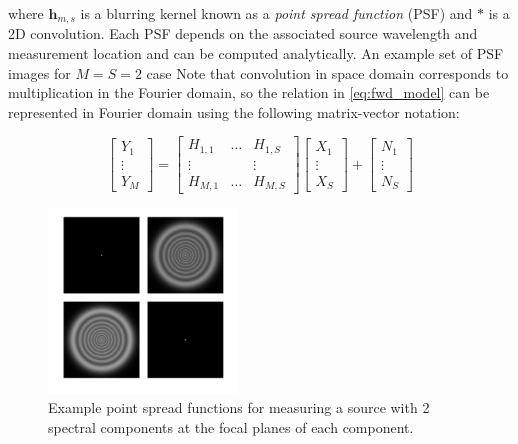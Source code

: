 \documentclass{article}
\begin{document}
where $\bm{h}_{m,s}$ is a blurring kernel known as a \emph{point spread
function} (PSF) and $\ast$ is a 2D convolution. Each PSF depends on the
associated source wavelength and measurement location and can be computed
analytically. An example set of PSF images for $M=S=2$ case
Note that convolution in space domain corresponds to
multiplication in the Fourier domain, so the relation in \eqref{eq:fwd_model}
can be represented in Fourier domain using the following matrix-vector notation:

\begin{equation}
\begin{bmatrix}Y_1 \\ \vdots \\ Y_M\end{bmatrix}
=
\begin{bmatrix}
  H_{1, 1} & \hdots & H_{1, S} \\
  \vdots & & \vdots \\
  H_{M, 1} & \hdots & H_{M, S}
\end{bmatrix}
\begin{bmatrix}X_1 \\ \vdots \\ X_S\end{bmatrix}
+
\begin{bmatrix}N_1 \\ \vdots \\ N_S\end{bmatrix}
\label{eq:fourier_mtx}
\end{equation}

\begin{figure}[htb]
  \begin{minipage}[b]{1\linewidth}
    \centering
    \centerline{\includegraphics[width=5cm]{psfs}}
  \end{minipage}
  \caption{Example point spread functions for measuring a source with 2 spectral
    components at the focal planes of each component.}
  \label{fig:pssi_drawing}
\end{figure}
\end{document}

